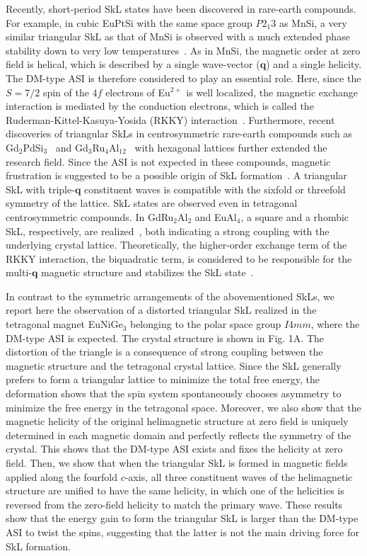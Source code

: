 \documentclass[aps,prb,reprint,superscriptaddress,amsmath,amssymb]{revtex4-2}
\begin{document}
Recently, short-period SkL states have been discovered in rare-earth compounds. For example, in cubic EuPtSi with the same space group $P2_{1}3$ as MnSi, a very similar triangular SkL as that of MnSi is observed with a much extended phase stability down to very low temperatures~\cite{Kakihana18,Kaneko19,Tabata19}. 
As in MnSi, the magnetic order at zero field is helical, which is described by a single wave-vector ($\bm{q}$) and a single helicity. 
The DM-type ASI is therefore considered to play an essential role. Here, since the $S=7/2$ spin of the $4f$ electrons of Eu$^{2+}$ is well localized, the magnetic exchange interaction is mediated by the conduction electrons, which is called the Ruderman-Kittel-Kasuya-Yosida (RKKY) interaction~\cite{Hayami17}. 
Furthermore, recent discoveries of triangular SkLs in centrosymmetric rare-earth compounds such as Gd$_2$PdSi$_3$~\cite{Kurumaji19} and Gd$_3$Ru$_4$Al$_{12}$~\cite{Hirschberger19} with hexagonal lattices further extended the research field. 
Since the ASI is not expected in these compounds, magnetic frustration is suggested to be a possible origin of SkL formation~\cite{Okubo12,Leonov15}. 
A triangular SkL with triple-$\bm{q}$ constituent waves is compatible with the sixfold or threefold symmetry of the lattice. 
SkL states are observed even in tetragonal centrosymmetric compounds. 
In GdRu$_2$Al$_2$ and EuAl$_4$, a square and a rhombic SkL, respectively, are realized~\cite{Khanh20,Khanh22,Takagi22}, both indicating a strong coupling with the underlying crystal lattice. 
Theoretically, the higher-order exchange term of the RKKY interaction, the biquadratic term, is considered to be responsible for the multi-$\bm{q}$ magnetic structure and stabilizes the SkL state~\cite{Hayami21,Yambe22}. 

In contrast to the symmetric arrangements of the abovementioned SkLs, we report here the observation of a distorted triangular SkL realized in the tetragonal magnet EuNiGe$_3$ belonging to the polar space group $I4mm$, where the DM-type ASI is expected. 
The crystal structure is shown in Fig. 1A. 
The distortion of the triangle is a consequence of strong coupling between the magnetic structure and the tetragonal crystal lattice. 
Since the SkL generally prefers to form a triangular lattice to minimize the total free energy, the deformation shows that the spin system spontaneously chooses asymmetry to minimize the free energy in the tetragonal space. 
Moreover, we also show that the magnetic helicity of the original helimagnetic structure at zero field is uniquely determined in each magnetic domain and perfectly reflects the symmetry of the crystal. 
This shows that the DM-type ASI exists and fixes the helicity at zero field.
Then, we show that when the triangular SkL is formed in magnetic fields applied along the fourfold $c$-axis, all three constituent waves of the helimagnetic structure are unified to have the same helicity, in which one of the helicities is reversed from the zero-field helicity to match the primary wave. 
These results show that the energy gain to form the triangular SkL is larger than the DM-type ASI to twist the spins, suggesting that the latter is not the main driving force for SkL formation. 
\end{document}
